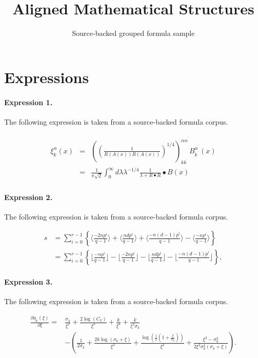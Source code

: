 \documentclass[11pt]{article}
\title{Aligned Mathematical Structures}
\author{Source-backed grouped formula sample}
\date{}
\begin{document}
\maketitle
\section{Expressions}
\paragraph{Expression 1.} The following expression is taken from a source-backed formula corpus.

\begin{align*}\begin{array}{ccl}\xi _k^\alpha (x) & = & \left( \left( \frac 1{R\left( A(x)\right) R\left(A(x)\right) }\right) ^{1/4}\right) _{kk^{^{\prime }}}^{\alpha \alpha^{^{\prime }}}B_{k^{^{\prime }}}^{\alpha ^{^{\prime }}}(x) \\ & = & \frac 1{\pi \sqrt{2}}\int_0^\infty d\lambda \lambda ^{-1/4}\frac1{\lambda +R\bullet R}\bullet B(x) \end{array}\end{align*}

\paragraph{Expression 2.} The following expression is taken from a source-backed formula corpus.

\begin{align*}s&=\sum_{i=0}^{r-1}\left\{\langle\frac{-2np^i}{q-1}\rangle+\langle\frac{ndp^i}{q-1}\rangle+\langle\frac{-n(d-1)p^i}{q-1}\rangle-\langle\frac{-np^i}{q-1}\rangle\right\}\\&=\sum_{i=0}^{r-1}\left\{\lfloor\frac{-np^i}{q-1}\rfloor-\lfloor\frac{-2np^i}{q-1}\rfloor-\lfloor\frac{ndp^i}{q-1}\rfloor-\lfloor\frac{-n(d-1)p^i}{q-1}\rfloor\right\},\end{align*}

\paragraph{Expression 3.} The following expression is taken from a source-backed formula corpus.

\begin{align*}\frac{\partial\eta_k(\xi)}{\partial \xi} =&\frac{\sigma_k}{\xi^2}+\frac{2\log(C_k)}{\xi^3}+\frac{k}{\xi^3}+\frac{k}{\xi^2\sigma_k}\\&-\left(\frac{1}{2\sigma_k}+\frac{2k\log(\sigma_k+\xi)}{\xi^3}+\frac{\log\left(\frac{1}{2}\left(1+\frac{\xi}{\sigma_k}\right)\right)}{\xi^3}+\frac{\xi^2-\sigma_k^2}{2\xi^2\sigma_k^2(\sigma_k+\xi)}\right).\end{align*}
\end{document}
